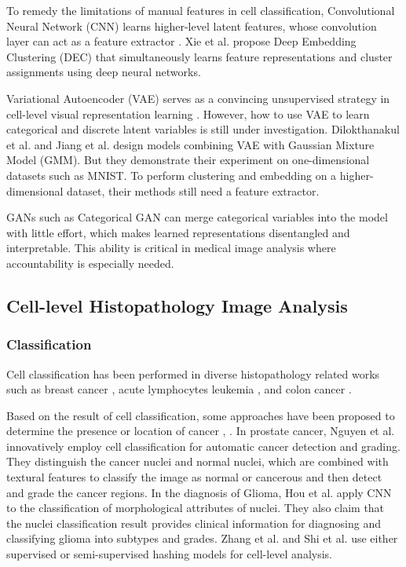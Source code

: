 \documentclass[journal]{IEEEtran}
\begin{document}
To remedy the limitations of manual features in cell classification, Convolutional Neural Network (CNN) learns higher-level latent features, whose convolution layer can act as a feature extractor \cite{xu2017large}. Xie et al. \cite{xie2016unsupervised} propose Deep Embedding Clustering (DEC) that simultaneously learns feature representations and cluster assignments using deep neural networks.

Variational Autoencoder (VAE) \cite{kingma2013auto} serves as a convincing unsupervised strategy in cell-level visual representation learning \cite{Xu2016Stacked,Cruzroa2013A, zhang2016fusing}. However, how to use VAE to learn categorical and discrete latent variables is still under investigation. Dilokthanakul et al. \cite{dilokthanakul2016deep} and Jiang et al. \cite{jiang2017variational} design models combining VAE with Gaussian Mixture Model (GMM). But they demonstrate their experiment on one-dimensional datasets such as MNIST. To perform clustering and embedding on a higher-dimensional dataset, their methods still need a feature extractor.

GANs such as Categorical GAN \cite{springenberg2015unsupervised} can merge categorical variables into the model with little effort, which makes learned representations disentangled and interpretable. This ability is critical in medical image analysis where accountability is especially needed.

\subsection{Cell-level Histopathology Image Analysis}
\subsubsection{Classification}

Cell classification has been performed in diverse histopathology related works such as breast cancer \cite{Malon2013Classification}, acute lymphocytes leukemia \cite{Mohapatra2014An,Zhao2016Automatic}, and colon cancer \cite{Sirinukunwattana2016Locality}.

Based on the result of cell classification, some approaches have been proposed to determine the presence or location of cancer \cite{Nguyen2011Prostate}, \cite{hou2016automatic}. In prostate cancer, Nguyen et al. \cite{Nguyen2011Prostate} innovatively employ cell classification for automatic cancer detection and grading. They distinguish the cancer nuclei and normal nuclei, which are combined with textural features to classify the image as normal or cancerous and then detect and grade the cancer regions. In the diagnosis of Glioma, Hou et al. \cite{hou2016automatic} apply CNN to the classification of morphological attributes of nuclei. They also claim that the nuclei classification result provides clinical information for diagnosing and classifying glioma into subtypes and grades. {Zhang et al. \cite{zhang2015weighted, zhang2015towards, zhang2015high} and Shi et al. \cite{shi2017cell} use either supervised or semi-supervised hashing models for cell-level analysis.}
\end{document}
